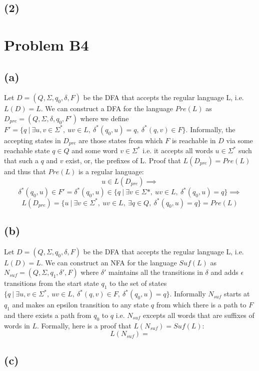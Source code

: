 \documentclass[12pt]{article}
\begin{document}
\subsection*{(2)}

\section*{Problem B4}
\subsection*{(a)}
  Let $D = (Q, \Sigma, q_0, \delta, F)$ be the DFA that accepts the regular
  language L, i.e. $L(D) = L$. We can construct a DFA for the language
  $Pre(L)$ as $D_{pre} = (Q, \Sigma, \delta, q_0, F')$ where we define
  $F' = \{q \:|\: \exists u,v \in \Sigma^* ,\: uv \in L
  ,\: \delta^* (q_0, u) = q ,\: \delta^* (q, v) \in F\}$.
  Informally, the accepting states in $D_{pre}$ are those states from which
  $F$ is reachable in $D$ via some reachable state $q \in Q$ and some
  word $v \in \Sigma^*$ i.e. it accepts all words $u \in \Sigma^*$
  such that such a $q$ and $v$ exist, or, the prefixes of L.
  Proof that $L(D_{pre}) = Pre(L)$ and thus that $Pre(L)$ is a regular language:
  $$u \in L(D_{pre}) \implies$$ $$\delta^*(q_0, u) \in F' =
  \delta^*(q_0, u) \in \{q \:|\: \exists v \in \Sigma* ,\: uv \in L
  ,\: \delta^*(q_0, u) = q\} \implies$$
  $$L(D_{pre}) = \{u \:|\: \exists v \in \Sigma^* ,\: uv \in L ,\:
  \exists q \in Q ,\: \delta^*(q_0, u) = q \}
  = Pre(L)$$
 
\subsection*{(b)}
  Let $D = (Q, \Sigma, q_0, \delta, F)$ be the DFA that accepts the regular
  language L, i.e. $L(D) = L$. We can construct an NFA for the language
  $Suf(L)$ as $N_{suf} = (Q, \Sigma, q_1, \delta{'}, F)$ where $\delta{'}$
  maintains all the transitions in $\delta$ and adds $\epsilon$ transitions
  from the start state $q_1$ to the set of states
  $\{q \:|\: \exists u,v \in \Sigma^* ,\: uv \in L ,\: \delta^* (q,v) \in F ,\:
  \delta^* (q_0,u) = q\}$. Informally $N_{suf}$ starts at $q_1$ and makes
  an epsilon transition to any state $q$ from which there is a path to $F$ and
  there exists a path from $q_0$ to $q$ i.e. $N_{suf}$ excepts all words that
  are suffixes of words in $L$. Formally, here is a proof that
  $L(N_{suf}) = Suf(L)$:
  $$L(N_{suf}) = $$
\subsection*{(c)}
\end{document}
